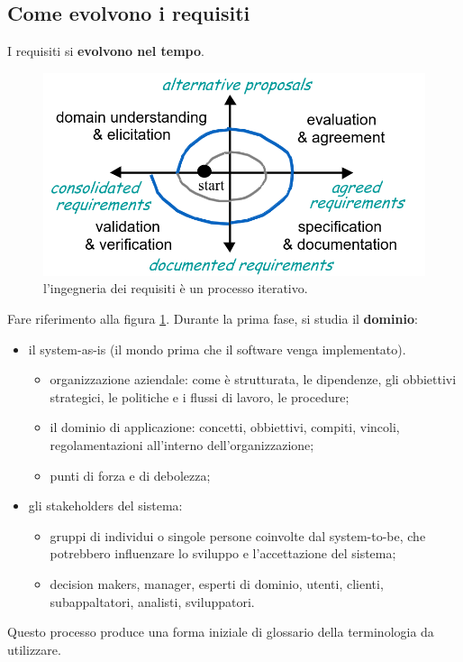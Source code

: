 \subsection{Come evolvono i requisiti}
I requisiti si \textbf{evolvono nel tempo}.
\begin{figure}[th]
	\centering
	\includegraphics[width=0.7\linewidth]{img/cycle-requirements}
	\caption{l'ingegneria dei requisiti è un processo iterativo.}
	\label{fig:cycle-requirements}
\end{figure}

Fare riferimento alla figura \ref{fig:cycle-requirements}. Durante la prima fase, si studia il \textbf{dominio}:
\begin{itemize}
	\item il system-as-is (il mondo prima che il software venga implementato).
	\begin{itemize}
		\item organizzazione aziendale: come è strutturata, le dipendenze, gli obbiettivi strategici, le politiche e i flussi di lavoro, le procedure;
		\item il dominio di applicazione: concetti, obbiettivi, compiti, vincoli, regolamentazioni all'interno dell'organizzazione;
		\item punti di forza e di debolezza;
	\end{itemize}
	\item gli stakeholders del sistema:
	\begin{itemize}
		\item gruppi di individui o singole persone coinvolte dal system-to-be, che potrebbero influenzare lo sviluppo e l'accettazione del sistema;
		\item decision makers, manager, esperti di dominio, utenti, clienti, subappaltatori, analisti, sviluppatori.
	\end{itemize}
\end{itemize}
Questo processo produce una forma iniziale di glossario della terminologia da utilizzare.

